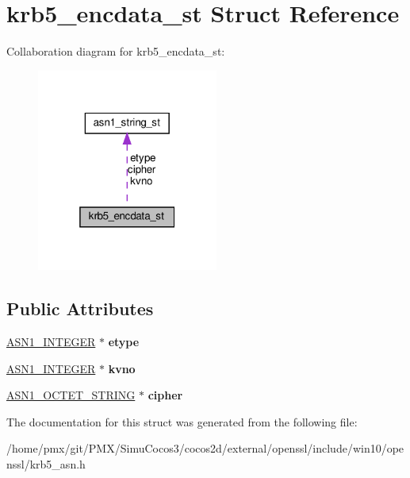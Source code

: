\hypertarget{structkrb5__encdata__st}{}\section{krb5\+\_\+encdata\+\_\+st Struct Reference}
\label{structkrb5__encdata__st}


Collaboration diagram for krb5\+\_\+encdata\+\_\+st\+:
\nopagebreak
\begin{figure}[H]
\begin{center}
\leavevmode
\includegraphics[width=169pt]{structkrb5__encdata__st__coll__graph}
\end{center}
\end{figure}
\subsection*{Public Attributes}
\begin{DoxyCompactItemize}
\item 
\mbox{\label{structkrb5__encdata__st_aa930746062320a82be3d81e363dd4ebf}} 
\hyperlink{structasn1__string__st}{A\+S\+N1\+\_\+\+I\+N\+T\+E\+G\+ER} $\ast$ {\bfseries etype}
\item 
\mbox{\label{structkrb5__encdata__st_a30352f26d2741ac03df07c308f0bbb66}} 
\hyperlink{structasn1__string__st}{A\+S\+N1\+\_\+\+I\+N\+T\+E\+G\+ER} $\ast$ {\bfseries kvno}
\item 
\mbox{\label{structkrb5__encdata__st_a55de40ea971f2f93c618ea49322cbe0c}} 
\hyperlink{structasn1__string__st}{A\+S\+N1\+\_\+\+O\+C\+T\+E\+T\+\_\+\+S\+T\+R\+I\+NG} $\ast$ {\bfseries cipher}
\end{DoxyCompactItemize}


The documentation for this struct was generated from the following file\+:\begin{DoxyCompactItemize}
\item 
/home/pmx/git/\+P\+M\+X/\+Simu\+Cocos3/cocos2d/external/openssl/include/win10/openssl/krb5\+\_\+asn.\+h\end{DoxyCompactItemize}
